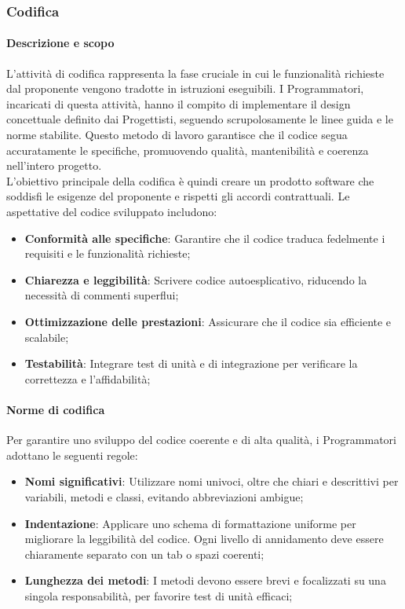 \documentclass[10pt]{article}
\begin{document}
\begin{justify}
    \subsubsection{Codifica}

        \paragraph{Descrizione e scopo} 
        L’attività di codifica rappresenta la fase cruciale in cui le funzionalità richieste dal proponente vengono tradotte in istruzioni eseguibili. I Programmatori, incaricati di questa attività, hanno il compito di implementare il design concettuale definito dai Progettisti, seguendo scrupolosamente le linee guida e le norme stabilite. Questo metodo di lavoro garantisce che il codice segua accuratamente le specifiche, promuovendo qualità, mantenibilità e coerenza nell’intero progetto.\\
        L’obiettivo principale della codifica è quindi creare un prodotto software che soddisfi le esigenze del proponente e rispetti gli accordi contrattuali. Le aspettative del codice sviluppato includono:
        \begin{itemize}
            \item \textbf{Conformità alle specifiche}: Garantire che il codice traduca fedelmente i requisiti e le funzionalità richieste;
            \item \textbf{Chiarezza e leggibilità}: Scrivere codice autoesplicativo, riducendo la necessità di commenti superflui;
            \item \textbf{Ottimizzazione delle prestazioni}: Assicurare che il codice sia efficiente e scalabile;
            \item \textbf{Testabilità}: Integrare test di unità e di integrazione per verificare la correttezza e l’affidabilità;
        \end{itemize}
    
        \paragraph{Norme di codifica}
        Per garantire uno sviluppo del codice coerente e di alta qualità, i Programmatori adottano le seguenti regole:
        \begin{itemize}
            \item \textbf{Nomi significativi}: Utilizzare nomi univoci, oltre che chiari e descrittivi per variabili, metodi e classi, evitando abbreviazioni ambigue;
            \item \textbf{Indentazione}: Applicare uno schema di formattazione uniforme per migliorare la leggibilità del codice. Ogni livello di annidamento deve essere chiaramente separato con un tab o spazi coerenti;
            \item \textbf{Lunghezza dei metodi}: I metodi devono essere brevi e focalizzati su una singola responsabilità, per favorire test di unità efficaci;
        \end{itemize}
    

\end{justify}
\end{document}
